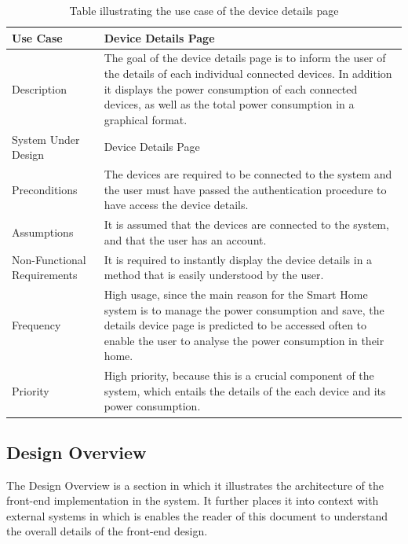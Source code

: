 \documentclass[10pt,twocolumn]{witseiepaper}
\begin{document}
	\begin{table}[H]
		\centering
		\caption{Table illustrating the use case of the device details page}
		\label{device_details_use_case}
		\begin{tabular}{| p{22mm} | p{50mm} |}
			\hline
			\textbf{Use Case} & \textbf{Device Details Page}\\
			\hline
			Description & The goal of the device details page is to inform the user of the details of each individual connected devices. In addition it displays the power consumption of each connected devices, as well as the total power consumption in a graphical format.\\
			\hline
			System Under Design & Device Details Page \\
			\hline
			Preconditions & The devices are required to be connected to the system and the user must have passed the authentication procedure to have access the device details. \\
			\hline
			Assumptions & It is assumed that the devices are connected to the system, and that the user has an account. \\
			\hline
			Non-Functional Requirements & It is required to instantly display the device details in a method that is easily understood by the user.\\
			\hline
			Frequency & High usage, since the main reason for the Smart Home system is to manage the power consumption and save, the details device page is predicted to be accessed often to enable the user to analyse the power consumption in their home.\\
			\hline
			Priority & High priority, because this is a crucial component of the system, which entails the details of the each device and its power consumption.\\
			\hline
		\end{tabular}
	\end{table}
	
	\subsection{Design Overview}
	The Design Overview is a section in which it illustrates the architecture of the front-end implementation in the system. It further places it into context with external systems in which is enables the reader of this document to understand the overall details of the front-end design.
	
\end{document}
